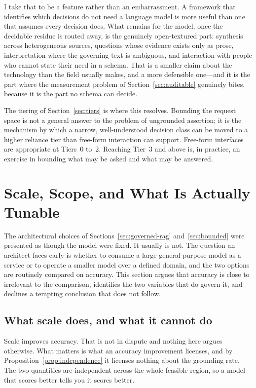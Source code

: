 \documentclass[11pt]{article}
\theoremstyle{plain}
\theoremstyle{definition}
\begin{document}
I take that to be a feature rather than an embarrassment. A framework that identifies
which decisions do not need a language model is more useful than one that assumes every
decision does. What remains for the model, once the decidable residue is routed away, is
the genuinely open-textured part: synthesis across heterogeneous sources, questions whose
evidence exists only as prose, interpretation where the governing text is ambiguous, and
interaction with people who cannot state their need in a schema. That is a smaller claim
about the technology than the field usually makes, and a more defensible one---and it is
the part where the measurement problem of Section~\ref{sec:auditable} genuinely bites,
because it is the part no schema can decide.

The tiering of Section~\ref{sec:tiers} is where this resolves. Bounding the request
space is not a general answer to the problem of ungrounded assertion; it is the
mechanism by which a narrow, well-understood decision class can be moved to a higher
reliance tier than free-form interaction can support. Free-form interfaces are
appropriate at Tiers~0 to~2. Reaching Tier~3 and above is, in practice, an exercise in
bounding what may be asked and what may be answered.


\section{Scale, Scope, and What Is Actually Tunable}
\label{sec:scale}

The architectural choices of Sections~\ref{sec:governed-rag} and~\ref{sec:bounded}
were presented as though the model were fixed. It usually is not. The question an
architect faces early is whether to consume a large general-purpose model as a
service or to operate a smaller model over a defined domain, and the two options are
routinely compared on accuracy. This section argues that accuracy is close to
irrelevant to the comparison, identifies the two variables that do govern it, and
declines a tempting conclusion that does not follow.

\subsection{What scale does, and what it cannot do}

Scale improves accuracy. That is not in dispute and nothing here argues otherwise.
What matters is what an accuracy improvement licenses, and by
Proposition~\ref{prop:independence} it licenses nothing about the grounding rate. The
two quantities are independent across the whole feasible region, so a model that
scores better tells you it scores better.
\end{document}
